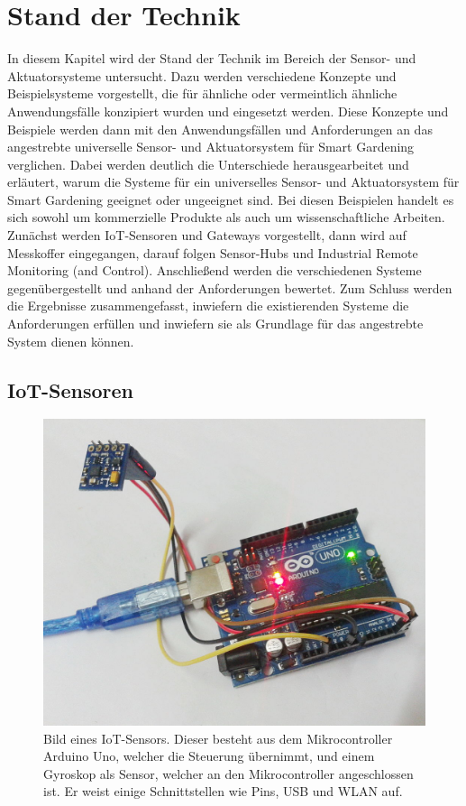 \chapter{Stand der Technik}\label{ch:stand-der-technik}
In diesem Kapitel wird der Stand der Technik im Bereich der Sensor- und Aktuatorsysteme untersucht.
Dazu werden verschiedene Konzepte und Beispielsysteme vorgestellt, die für ähnliche oder vermeintlich ähnliche Anwendungsfälle konzipiert wurden und eingesetzt werden.
Diese Konzepte und Beispiele werden dann mit den Anwendungsfällen und Anforderungen an das angestrebte universelle Sensor- und Aktuatorsystem für Smart Gardening verglichen.
Dabei werden deutlich die Unterschiede herausgearbeitet und erläutert, warum die Systeme für ein universelles Sensor- und Aktuatorsystem für Smart Gardening geeignet oder ungeeignet sind.
Bei diesen Beispielen handelt es sich sowohl um kommerzielle Produkte als auch um wissenschaftliche Arbeiten.
Zunächst werden IoT-Sensoren und Gateways vorgestellt, dann wird auf Messkoffer eingegangen, darauf folgen Sensor-Hubs und Industrial Remote Monitoring (and Control).
Anschließend werden die verschiedenen Systeme gegenübergestellt und anhand der Anforderungen bewertet.
Zum Schluss werden die Ergebnisse zusammengefasst, inwiefern die existierenden Systeme die Anforderungen erfüllen und inwiefern sie als Grundlage für das angestrebte System dienen können.



\section{IoT-Sensoren}
\begin{figure}[!htb]
	\centering
	\includegraphics[height=0.4\textheight]{images/IoT-Sensor.jpg}
	\caption[Bild eines IoT-Sensors.]{Bild eines IoT-Sensors.
		Dieser besteht aus dem Mikrocontroller Arduino Uno, welcher die Steuerung übernimmt, und einem Gyroskop als Sensor, welcher an den Mikrocontroller angeschlossen ist.
		Er weist einige Schnittstellen wie Pins, USB und WLAN auf.\footnotemark
	}
	\label{pic:iotsensor}
\end{figure}

